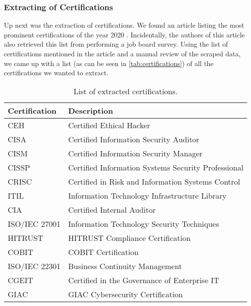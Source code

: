 \documentclass[runningheads]{llncs}
\begin{document}
\subsubsection{Extracting of Certifications}
\label{subsub:extracting_of_certifications}

Up next was the extraction of certifications. We found an article listing the most prominent certifications of the year 2020 \cite{certifications}. Incidentally, the authors of this article also retrieved this list from performing a job board survey. Using the list of certifications mentioned in the article and a manual review of the scraped data, we came up with a list (as can be seen in \autoref{tab:certifications}) of all the certifications we wanted to extract.

\begin{table}[ht]
	\centering
  \caption{List of extracted certifications.}
  \label{tab:certifications}

  \begin{tabular}{|l|l|}
    \hline
    \textbf{Certification} & \textbf{Description}                                \\ \hline
    CEH                    & Certified Ethical Hacker                            \\ \hline
    CISA                   & Certified Information Security Auditor              \\ \hline
    CISM                   & Certified Information Security Manager              \\ \hline
    CISSP                  & Certified Information Systems Security Professional \\ \hline
    CRISC                  & Certified in Risk and Information Systems Control   \\ \hline
    ITIL                   & Information Technology Infrastructure Library       \\ \hline
    CIA                    & Certified Internal Auditor                          \\ \hline
    ISO/IEC 27001          & Information Technology Security Techniques          \\ \hline
    HITRUST                & HITRUST Compliance Certification                    \\ \hline
    COBIT                  & COBIT Certification                                 \\ \hline
    ISO/IEC 22301          & Business Continuity Management                      \\ \hline
    CGEIT                  & Certified in the Governance of Enterprise IT        \\ \hline
    GIAC                   & GIAC Cybersecurity Certification                    \\ \hline
  \end{tabular}
\end{table}
\end{document}
